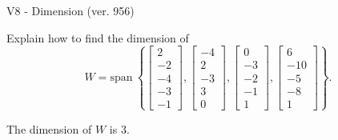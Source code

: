 \begin{exercise}
  \begin{exerciseTitle}V8 - Dimension (ver. 956)\end{exerciseTitle}
  \begin{exerciseStatement}
    Explain how to find the dimension of 
\[W=\mathrm{span}\ \left\{\left[\begin{array}{r}
2 \\
-2 \\
-4 \\
-3 \\
-1
\end{array}\right] , \left[\begin{array}{r}
-4 \\
2 \\
-3 \\
3 \\
0
\end{array}\right] , \left[\begin{array}{r}
0 \\
-3 \\
-2 \\
-1 \\
1
\end{array}\right] , \left[\begin{array}{r}
6 \\
-10 \\
-5 \\
-8 \\
1
\end{array}\right]\right\}.\]



  \end{exerciseStatement}
  \begin{exerciseAnswer}
   The dimension of \(W\) is  \(3\).
  


  \end{exerciseAnswer}
\end{exercise}